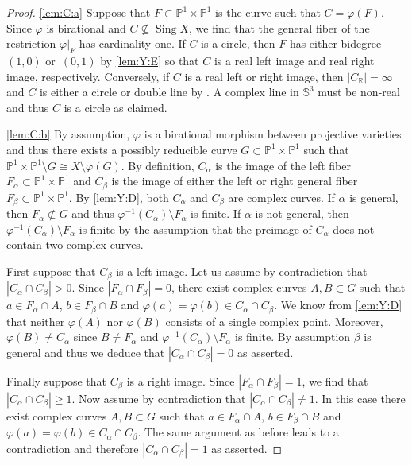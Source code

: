 \documentclass[11pt]{article}
\newcommand{\RL}[2]{\Cref{lem:#1}\ref{lem:#1:#2}}
\newcommand{\R}{\mathbb{R}}
\renewcommand{\P}{\mathbb{P}}
\renewcommand{\S}{\mathbb{S}}
\newcommand{\Sing}{\operatorname{Sing}}
\newcommand{\resp}{respectively}
\newcommand{\st}{such that }
\begin{document}
\begin{proof}
\ref{lem:C:a}
Suppose that $F\subset\P^1\times\P^1$ is the curve \st $C=\varphi(F)$.
Since $\varphi$ is birational and $C\nsubseteq\Sing X$, we find that
the general fiber of the restriction $\varphi|_F$ has cardinality one.
If $C$ is a circle, then $F$ has either bidegree~$(1,0)$
or~$(0,1)$ by \RL{Y}{E} so that $C$ is a real left image and real right image, \resp.
Conversely, if $C$ is a real left or right image, then
$|C_\R|=\infty$ and $C$ is either a circle or double line by .
A complex line in $\S^3$ must be non-real and thus $C$ is a circle as claimed.

\ref{lem:C:b}
By assumption, $\varphi$ is a birational morphism between projective varieties
and thus there exists a possibly reducible
curve $G\subset\P^1\times\P^1$ \st
$\P^1\times\P^1\setminus G\cong X\setminus\varphi(G)$.
By definition, $C_\alpha$ is the image of the left fiber $F_\alpha\subset\P^1\times\P^1$
and $C_\beta$ is the image of either the left or right general fiber $F_\beta\subset\P^1\times\P^1$.
By \RL{Y}{D}, both $C_\alpha$ and $C_\beta$ are complex curves.
If $\alpha$ is general, then $F_\alpha\not\subset G$
and thus $\varphi^{-1}(C_\alpha)\setminus F_\alpha$ is finite.
If $\alpha$ is not general, then
$\varphi^{-1}(C_\alpha)\setminus F_\alpha$ is finite by the assumption
that the preimage of $C_\alpha$ does not contain two complex curves.

First suppose that $C_\beta$ is a left image.
Let us assume by contradiction that $|C_\alpha\cap C_\beta|>0$.
Since $|F_\alpha\cap F_\beta|=0$,
there exist complex curves $A,B\subset G$
\st
$a\in F_\alpha\cap A$, $b\in F_\beta\cap B$
and $\varphi(a)=\varphi(b)\in C_\alpha\cap C_\beta$.
We know from \RL{Y}{D} that neither $\varphi(A)$ nor $\varphi(B)$
consists of a single complex point.
Moreover, $\varphi(B)\neq C_\alpha$
since
$B\neq F_\alpha$ and
$\varphi^{-1}(C_\alpha)\setminus F_\alpha$ is finite.
By assumption $\beta$ is general and
thus we deduce that $|C_\alpha\cap C_\beta|=0$ as asserted.

Finally suppose that $C_\beta$ is a right image.
Since $|F_\alpha\cap F_\beta|=1$, we find that $|C_\alpha\cap C_\beta|\geq 1$.
Now assume by contradiction that $|C_\alpha\cap C_\beta|\neq 1$.
In this case there exist complex curves $A,B\subset G$
\st
$a\in F_\alpha\cap A$, $b\in F_\beta\cap B$
and $\varphi(a)=\varphi(b)\in C_\alpha\cap C_\beta$.
The same argument as before
leads to a contradiction
and therefore $|C_\alpha\cap C_\beta|=1$ as asserted.
\end{proof}
\end{document}
